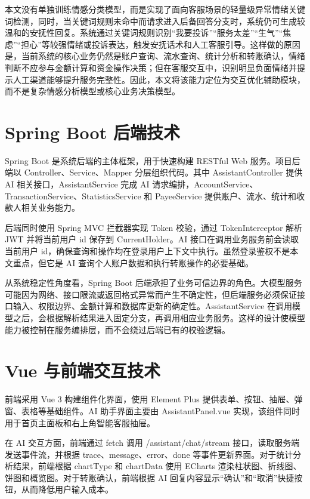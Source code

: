 \documentclass[bachelor, print]{xduthesis}
\begin{document}
本文没有单独训练情感分类模型，而是实现了面向客服场景的轻量级异常情绪关键词检测，同时，当关键词规则未命中而请求进入后备回答分支时，系统仍可生成较温和的安抚性回复。系统通过关键词规则识别“我要投诉”“服务太差”“生气”“焦虑”“担心”等较强情绪或投诉表达，触发安抚话术和人工客服引导。这样做的原因是，当前系统的核心业务仍然是账户查询、流水查询、统计分析和转账确认，情绪判断不应参与金额计算和资金操作决策；但在客服交互中，识别明显负面情绪并提示人工渠道能够提升服务完整性。因此，本文将该能力定位为交互优化辅助模块，而不是复杂情感分析模型或核心业务决策模型。

\section{Spring Boot 后端技术}

Spring Boot 是系统后端的主体框架，用于快速构建 RESTful Web 服务\cite{springboot}。项目后端以 Controller、Service、Mapper 分层组织代码。其中 AssistantController 提供 AI 相关接口，AssistantService 完成 AI 请求编排，AccountService、TransactionService、StatisticsService 和 PayeeService 提供账户、流水、统计和收款人相关业务能力。

后端同时使用 Spring MVC 拦截器实现 Token 校验，通过 TokenInterceptor 解析 JWT 并将当前用户 id 保存到 CurrentHolder。AI 接口在调用业务服务前会读取当前用户 id，确保查询和操作均在登录用户上下文中执行。虽然登录鉴权不是本文重点，但它是 AI 查询个人账户数据和执行转账操作的必要基础。

从系统稳定性角度看，Spring Boot 后端承担了业务可信边界的角色。大模型服务可能因为网络、接口限流或返回格式异常而产生不确定性，但后端服务必须保证接口输入、权限边界、金额计算和数据库更新的确定性。AssistantService 在调用模型之后，会根据解析结果进入固定分支，再调用相应业务服务。这样的设计使模型能力被控制在服务编排层，而不会绕过后端已有的校验逻辑。

\section{Vue 与前端交互技术}

前端采用 Vue 3 构建组件化界面\cite{vue}，使用 Element Plus 提供表单、按钮、抽屉、弹窗、表格等基础组件。AI 助手界面主要由 AssistantPanel.vue 实现，该组件同时用于首页主面板和右上角智能客服抽屉。

在 AI 交互方面，前端通过 fetch 调用 /assistant/chat/stream 接口，读取服务端发送事件流，并根据 trace、message、error、done 等事件更新界面。对于统计分析结果，前端根据 chartType 和 chartData 使用 ECharts 渲染柱状图、折线图、饼图和概览图\cite{echarts}。对于转账确认，前端根据 AI 回复内容显示“确认”和“取消”快捷按钮，从而降低用户输入成本。
\end{document}
